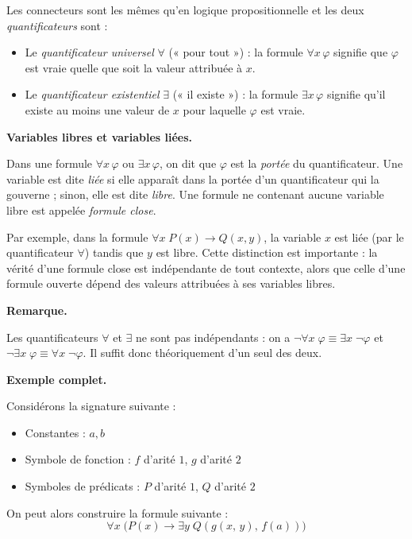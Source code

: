 \documentclass[11pt]{article}
\newenvironment{remarque}{%
    \begin{mdframed}[
        linecolor=sectioncolor!40,
        linewidth=0.8pt,
        backgroundcolor=sectioncolor!5,
        innerleftmargin=10pt,
        innerrightmargin=10pt,
        innertopmargin=6pt,
        innerbottommargin=6pt,
        skipabove=8pt,
        skipbelow=8pt
    ]
    \noindent\textbf{\small\color{sectioncolor}Remarque.}\enspace\small\itshape
}{%
    \end{mdframed}
}
\begin{document}
Les connecteurs sont les mêmes qu'en logique propositionnelle et les  deux \textit{quantificateurs} sont :

\begin{itemize}
    \item Le \textit{quantificateur universel} $\forall$ (« pour tout ») : la formule
    $\forall x\, \varphi$ signifie que $\varphi$ est vraie quelle que soit la valeur
    attribuée à $x$.
    \item Le \textit{quantificateur existentiel} $\exists$ (« il existe ») : la formule
    $\exists x\, \varphi$ signifie qu'il existe au moins une valeur de $x$ pour laquelle
    $\varphi$ est vraie.
\end{itemize}

\vspace{0.4cm}
\noindent\textbf{Variables libres et variables liées.}

\vspace{0.2cm}
Dans une formule $\forall x\, \varphi$ ou $\exists x\, \varphi$, on dit que $\varphi$ est
la \textit{portée} du quantificateur. Une variable est dite \textit{liée} si elle
apparaît dans la portée d'un quantificateur qui la gouverne ; sinon, elle est dite
\textit{libre}. Une formule ne contenant aucune variable libre est appelée
\textit{formule close}.

\vspace{0.2cm}
Par exemple, dans la formule $\forall x\; P(x) \rightarrow Q(x, y)$, la variable $x$
est liée (par le quantificateur $\forall$) tandis que $y$ est libre. Cette distinction
est importante : la vérité d'une formule close est indépendante de tout contexte, alors
que celle d'une formule ouverte dépend des valeurs attribuées à ses variables libres.

\begin{remarque}
    Les quantificateurs $\forall$ et $\exists$ ne sont pas indépendants : on a
    $\neg \forall x\; \varphi \equiv \exists x\; \neg\varphi$ et
    $\neg \exists x\; \varphi \equiv \forall x\; \neg\varphi$. Il suffit donc
    théoriquement d'un seul des deux.
\end{remarque}

\vspace{0.4cm}
\noindent\textbf{Exemple complet.} 

\vspace{0.2cm}
Considérons la signature suivante :
\begin{itemize}
    \item Constantes : $a, b$
    \item Symbole de fonction : $f$ d'arité $1$, $g$ d'arité $2$
    \item Symboles de prédicats : $P$ d'arité $1$, $Q$ d'arité $2$
\end{itemize}
On peut alors construire la formule suivante :
$$
    \forall x\; \bigl(P(x) \rightarrow \exists y\; Q\!\left(g(x,\, y),\, f(a)\right)\bigr)
$$
\end{document}

